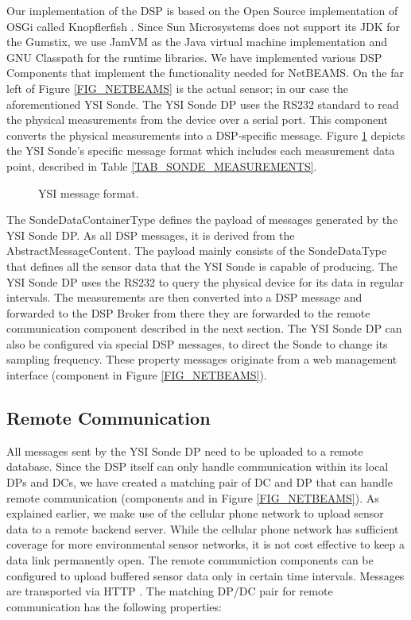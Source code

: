 \documentclass[conference]{IEEEtran}
\begin{document}
Our implementation of the DSP is based on the Open Source
implementation of OSGi called Knopflerfish \cite{knopflerfish01}.
Since Sun Microsystems does not support its JDK for the Gumstix, we
use JamVM \cite{jamvm01} as the Java virtual machine implementation
and GNU Classpath \cite{classpath01} for the runtime libraries. We
have implemented various DSP Components that implement the
functionality needed for NetBEAMS. On the far left of Figure
\ref{FIG_NETBEAMS} is the actual sensor; in our case the
aforementioned YSI Sonde. The YSI Sonde DP  uses the RS232 standard
to read the physical measurements from the device over a serial port.
This component converts the physical measurements into a DSP-specific
message. Figure \ref{FIG_DSP_YSI_DATA} depicts the YSI Sonde's
specific message format which includes each measurement data point,
described in Table \ref{TAB_SONDE_MEASUREMENTS}.

\begin{figure}[!htb]
\centering
{}
\caption{\label{FIG_DSP_YSI_DATA} YSI message format.}
\end{figure}

The SondeDataContainerType defines the payload of messages generated
by the YSI Sonde DP. As all DSP messages, it is derived from the
AbstractMessageContent. The payload mainly consists of the
SondeDataType that defines all the sensor data that the YSI Sonde is
capable of producing. The YSI Sonde DP uses the RS232 to query the
physical device for its data in regular intervals. The measurements
are then converted into a DSP message and forwarded to the DSP Broker
from there they are forwarded to the remote communication component
described in the next section.  The YSI Sonde DP can also be
configured via special DSP messages, to direct the Sonde to change its
sampling frequency.  These property messages originate from a web
management interface (component  in Figure \ref{FIG_NETBEAMS}).


\subsection{Remote Communication}

All messages sent by the YSI Sonde DP need to be uploaded to a remote
database. Since the DSP itself can only handle communication within
its local DPs and DCs, we have created a matching pair of DC and DP
that can handle remote communication (components  and  in Figure
\ref{FIG_NETBEAMS}). As explained earlier, we make use of the cellular
phone network to upload sensor data to a remote backend server. While
the cellular phone network has sufficient coverage for more
environmental sensor networks, it is not cost effective to keep a data
link permanently open. The remote communiction components can be
configured to upload buffered sensor data only in certain time
intervals. Messages are transported via HTTP \cite{RFC2068}. The
matching DP/DC pair for remote communication has the following
properties:
\end{document}

